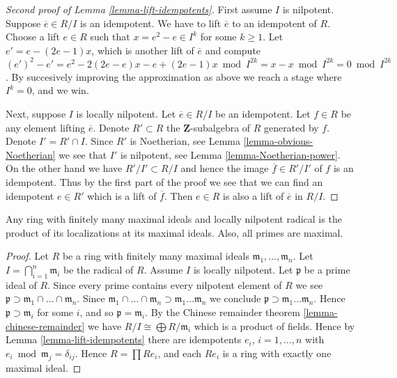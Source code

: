 \begin{proof}[Second proof of Lemma \ref{lemma-lift-idempotents}]
First assume $I$ is nilpotent.
Suppose $\overline{e} \in R/I$ is an idempotent.
We have to lift $\overline{e}$ to an idempotent of $R$.
Choose a lift $e \in R$ such that $x = e^2 - e \in I^k$ for some
$k\geq 1$. Let $e' = e - (2e-1)x$, which is another lift of $\overline{e}$
and compute $(e')^2 - e' =
e^2 - 2(2e-e)x - e + (2e-1)x \bmod I^{2k} =
x - x \bmod I^{2k} = 0 \bmod I^{2k}$.
By succesively improving the approximation as above we reach a
stage where $I^k = 0$, and we win.

\medskip\noindent
Next, suppose $I$ is locally nilpotent. 
Let $\overline{e} \in R/I$ be an idempotent.
Let $f \in R$ be any element lifting $\overline{e}$.
Denote $R' \subset R$ the $\mathbf{Z}$-subalgebra of $R$ generated
by $f$. Denote $I' = R' \cap I$. Since $R'$ is Noetherian,
see Lemma \ref{lemma-obvious-Noetherian} we see that $I'$ is
nilpotent, see Lemma \ref{lemma-Noetherian-power}. On the other
hand we have $R' / I' \subset R/I$ and hence the image
$\overline{f} \in R'/I'$ of $f$ is an idempotent. 
Thus by the first part of the proof we see that
we can find an idempotent $e \in R'$ which
is a lift of $\overline{f}$.
Then $e \in R$ is also a lift of $\overline{e}$ in $R/I$.
\end{proof}

\begin{lemma}
\label{lemma-product-local}
Any ring with finitely many maximal ideals and
locally nilpotent radical is the product of its localizations
at its maximal ideals. Also, all primes are maximal.
\end{lemma}

\begin{proof}
Let $R$ be a ring with finitely many maximal ideals
$\mathfrak m_1,\ldots,\mathfrak m_n$.
Let $I = \bigcap_{i=1}^n \mathfrak m_i$
be the radical of $R$. Assume $I$ is locally nilpotent.
Let $\mathfrak p$ be a prime ideal of $R$.
Since every prime contains every nilpotent
element of $R$ we see
$ \mathfrak p \supset \mathfrak m_1 \cap \ldots \cap \mathfrak m_n$.
Since $\mathfrak m_1 \cap \ldots \cap \mathfrak m_n \supset
\mathfrak m_1 \ldots \mathfrak m_n$
we conclude $\mathfrak p \supset \mathfrak m_1 \ldots \mathfrak m_n$.
Hence $\mathfrak p \supset \mathfrak m_i$ for some $i$, and so
$\mathfrak p = \mathfrak m_i$. By the Chinese remainder
theorem \ref{lemma-chinese-remainder}
we have $R/I \cong \bigoplus R/\mathfrak m_i$
which is a product of fields.
Hence by Lemma \ref{lemma-lift-idempotents}
there are idempotents $e_i$, $i=1,\ldots,n$
with $e_i \bmod \mathfrak m_j = \delta_{ij}$.
Hence $R = \prod Re_i$, and each $Re_i$ is a
ring with exactly one maximal ideal.
\end{proof}

